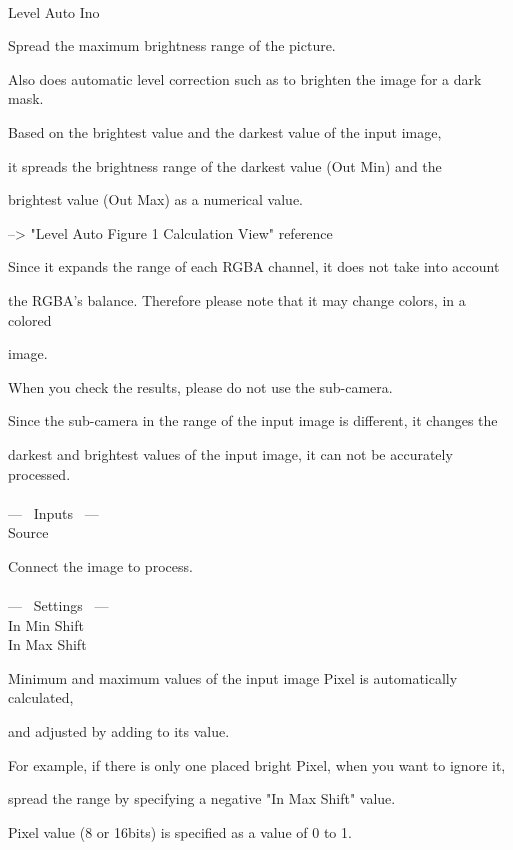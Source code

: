 \documentclass[a4paper,12pt]{article}
\begin{document}
\thispagestyle{empty}

\Large
\noindent \\
Level Auto Ino\medskip
\par
\normalsize
Spread the maximum brightness range of the picture.\\
\par
Also does automatic level correction such as to brighten the image for a dark mask.\\
\par
Based on the brightest value and the darkest value of the input image,\par
it spreads the brightness range of the darkest value (Out Min) and the\par
brightest value (Out Max) as a numerical value.\par
--> "Level Auto Figure 1 Calculation View" reference\\
\par
Since it expands the range of each RGBA channel, it does not take into account\par
the RGBA's balance. Therefore please note that it may change colors, in a colored\par
image.\\
\par
When you check the results, please do not use the sub-camera.\par
Since the sub-camera in the range of the input image is different, it changes the\par
darkest and brightest values of the input image, it can not be accurately processed.\\
\\
--- \ Inputs \ ---\\
Source\par
Connect the image to process.\\
\\
--- \ Settings \ ---\\
In Min Shift\\
In Max Shift\par
Minimum and maximum values of the input image Pixel is automatically calculated,\par
 and adjusted by adding to its value.\par
For example, if there is only one placed bright Pixel, when you want to ignore it,\par
spread the range by specifying a negative "In Max Shift" value.\par
Pixel value (8 or 16bits) is specified as a value of 0 to 1.\par
\end{document}
